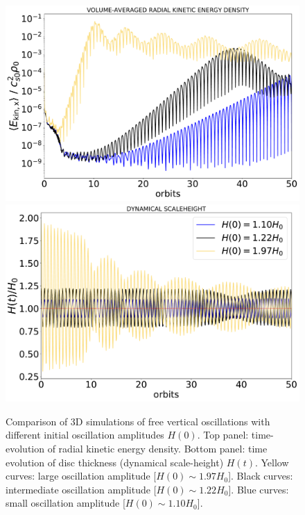 \documentclass[fleqn,usenatbib]{mnras}
\begin{document}
\begin{figure}
\centering
\includegraphics[scale=0.25]{Figures/figure00PRODUCTION2_VSTRHYDRORes32Re4687H6WeakBouncezBCReflectiveLx8HComparison_timeevolution_volavg_kineticenergydensity_xcomp.pdf}
\includegraphics[scale=0.25]{Figures/figure00PRODUCTION2_VSTRHYDRORes32Re4687H6WeakBouncezBCReflectiveLx8HComparison_timeevolution_dynamicalH.pdf}
\caption{Comparison of 3D simulations of free vertical oscillations with different initial oscillation amplitudes $H(0)$. Top panel: time-evolution of radial kinetic energy density. Bottom panel: time evolution of disc thickness (dynamical scale-height) $H(t)$. Yellow curves: large oscillation amplitude [$H(0)\sim1.97H_0$]. Black curves: intermediate oscillation amplitude [$H(0)\sim1.22H_0$]. Blue curves: small oscillation amplitude [$H(0)\sim1.10H_0$].}
\label{FIGURE_FreeBounceAmplitudeComparison}
\end{figure}
\end{document}

